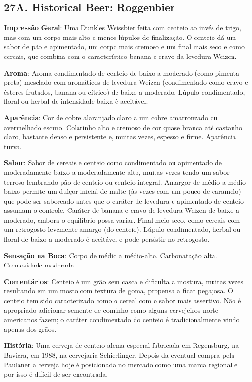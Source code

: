 \subsection*{27A. Historical Beer: Roggenbier}
\textbf{Impressão Geral}: Uma Dunkles Weissbier feita com centeio ao invés de trigo, mas com um corpo mais alto e menos lúpulos de finalização. O centeio dá um sabor de pão e apimentado, um corpo mais cremoso e um final mais seco e como cereais, que combina com o característico banana e cravo da levedura Weizen.

\textbf{Aroma}: Aroma condimentado de centeio de baixo a moderado (como pimenta preta) mesclado com aromáticos de levedura Weizen (condimentado como cravo e ésteres frutados, banana ou cítrico) de baixo a moderado. Lúpulo condimentado, floral ou herbal de intensidade baixa é aceitável.

\textbf{Aparência}: Cor de cobre alaranjado claro a um cobre amarronzado ou avermelhado escuro. Colarinho alto e cremoso de cor quase branca até castanho claro, bastante denso e persistente e, muitas vezes, espesso e firme. Aparência turva.

\textbf{Sabor}: Sabor de cereais e centeio como condimentado ou apimentado de moderadamente baixo a moderadamente alto, muitas vezes tendo um sabor terroso lembrando pão de centeio ou centeio integral. Amargor de médio a médio-baixo permite um dulçor inicial de malte (às vezes com um pouco de caramelo) que pode ser saboreado antes que o caráter de levedura e apimentado de centeio assumam o controle. Caráter de banana e cravo de levedura Weizen de baixo a moderado, embora o equilíbrio possa variar. Final meio seco, como cereais com um retrogosto levemente amargo (do centeio). Lúpulo condimentado, herbal ou floral de baixo a moderado é aceitável e pode persistir no retrogosto.

\textbf{Sensação na Boca}: Corpo de médio a médio-alto. Carbonatação alta. Cremosidade moderada.

\textbf{Comentários}: Centeio é um grão sem casca e dificulta a mostura, muitas vezes resultando em um mosto com textura de goma, propensa a ficar pegajosa. O centeio tem sido caracterizado como o cereal com o sabor mais assertivo. Não é apropriado adicionar semente de cominho como alguns cervejeiros norte-americanos fazem; o caráter condimentado do centeio é tradicionalmente vindo apenas dos grãos.

\textbf{História}: Uma cerveja de centeio alemã especial fabricada em Regensburg, na Baviera, em 1988, na cervejaria Schierlinger. Depois da eventual compra pela Paulaner a cerveja hoje é posicionada no mercado como uma marca regional e por isso é difícil de ser encontrada.

